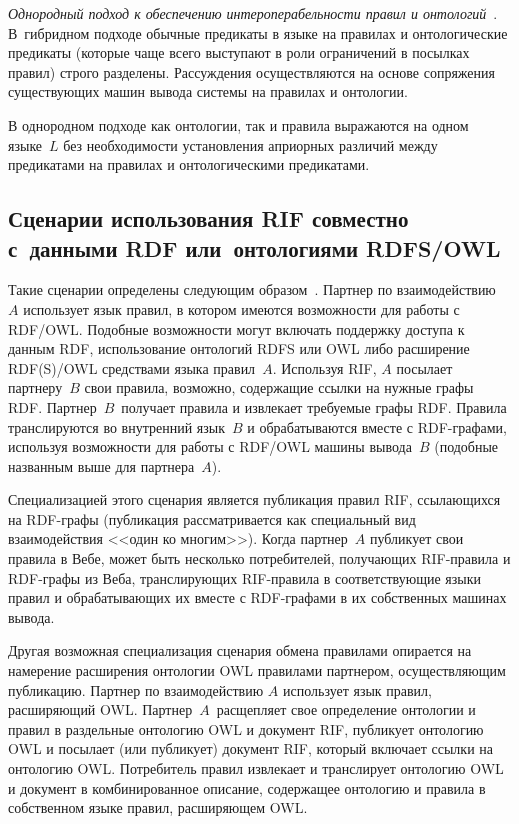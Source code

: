 \begin{multicols}{2}
\textit{Однородный подход к обеспечению интероперабельности правил и 
онтологий}~\cite{44kal}. В~гибридном подходе обычные предикаты в языке на правилах и 
онтологические предикаты (которые чаще всего выступают в роли ограничений в посылках 
правил) строго разделены. Рассуждения осуществляются на основе сопряжения 
существующих машин вывода системы на правилах и онтологии.

В однородном подходе как онтологии, так и правила выражаются на одном языке~$L$ без 
необходимости установления априорных различий между предикатами на правилах и 
онтологическими предикатами.
   
   \subsection{Сценарии использования RIF совместно с~данными RDF или~онтологиями 
RDFS/OWL} %

Такие сценарии определены следующим образом~\cite{45kal}. Партнер по 
взаимодействию~$A$ использует язык правил, в котором имеются возможности для работы 
с RDF/OWL. Подобные возможности могут включать поддержку доступа к данным RDF, 
использование онтологий RDFS или OWL либо расширение RDF(S)/OWL средствами языка 
правил~$A$. Используя RIF, $A$ посылает партнеру~$B$ свои правила, возможно, 
содержащие ссылки на нужные графы RDF. Партнер~$B$~получает правила и извлекает требуемые 
графы RDF. Правила транслируются во внутренний язык~$B$ и обрабатываются вместе с 
RDF-графами, используя возможности для работы с RDF/OWL машины вывода~$B$ 
(подобные названным выше для партнера~$A$).

Специализацией этого сценария является пуб\-ли\-ка\-ция правил RIF, ссылающихся на 
RDF-гра\-фы (публикация рассматривается как специальный вид взаимодействия <<один 
ко многим>>). Когда партнер~$A$ публикует свои правила в Вебе, может быть несколько 
потребителей, получающих RIF-пра\-ви\-ла и RDF-гра\-фы из Веба, транслирующих 
RIF-пра\-ви\-ла в соответствующие языки правил и обрабатывающих их вместе с 
RDF-гра\-фа\-ми в их собственных машинах вывода.

Другая возможная специализация сценария обме\-на правилами опирается на намерение 
расширения онтологии OWL правилами партнером, осуществляющим публикацию. Партнер 
по взаимодействию $A$ использует язык правил, расширяющий OWL. Партнер~$A$~расщепляет свое 
определение онтологии и правил в раздельные онтологию OWL и документ RIF, пуб\-ли\-ку\-ет 
онтологию OWL и посылает (или пуб\-ли\-ку\-ет) документ RIF, который включает ссылки на 
онтологию OWL. Потребитель правил извлекает и транслирует онтологию OWL и документ 
в комбинированное описание, содержащее онтологию и правила в собственном языке 
правил, рас\-ши\-ря\-ющем OWL.
   

\end{multicols}
